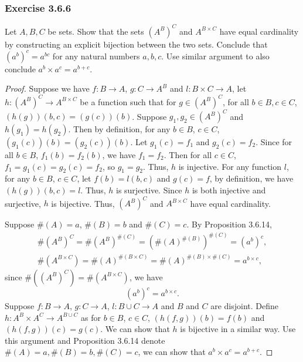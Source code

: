 \documentclass[12pt, letter]{article}
\begin{document}
\subsubsection*{Exercise 3.6.6}
Let $A,B,C$ be sets. Show that the sets $(A^B)^C$ and $A^{B\times C}$ have equal cardinality by constructing an explicit bijection between the two sets.
Conclude that $(a^b)^c=a^{bc}$ for any natural numbers $a,b,c$. Use similar argument to also conclude $a^b\times a^c=a^{b+c}$.
\begin{proof}
    Suppose we have $f:B\to A$, $g:C\to A^B$ and $l:B\times C\to A$, let $h:(A^B)^C\to A^{B\times C}$ be a function such that for $g\in (A^B)^C$, for all $b\in B, c\in C$,
    $(h(g))(b,c)=(g(c))(b)$. Suppose $g_1,g_2\in (A^B)^C$ and $h(g_1)=h(g_2)$. Then by definition, for any $b\in B$, $c\in C$, $(g_1(c))(b)=(g_2(c))(b)$. Let $g_1(c)=f_1$ and $g_2(c)=f_2$. 
    Since for all $b\in B$, $f_1(b)=f_2(b)$, we have $f_1=f_2$. Then for all $c\in C$, $f_1=g_1(c)=g_2(c)=f_2$, so $g_1=g_2$. Thus, $h$ is injective. For any function $l$, for any
    $b\in B$, $c\in C$, let $f(b)=l(b,c)$ and $g(c)=f$, by definition, we have $(h(g))(b,c)=l$. Thus, $h$ is surjective. Since $h$ is both injective and surjective, $h$ is bijective. Thus,
    $(A^B)^C$ and $A^{B\times C}$ have equal cardinality. 
    
    Suppose $\#(A)=a$, $\#(B)=b$ and $\#(C)=c$. By Proposition 3.6.14,
    \begin{equation*}
        \begin{gathered}
            \#(A^B)^C=\#(A^B)^{\#(C)}=(\#(A)^{\#(B)})^{\#(C)}=(a^b)^c,\\
            \#(A^{B\times C})=\#(A)^{\#(B\times C)}=\#(A)^{\#(B)\times \#(C)}=a^{b\times c},
        \end{gathered}
    \end{equation*}
    since $\#((A^B)^C)=\#(A^{B \times C})$, we have 
    \begin{equation*}
        (a^b)^c=a^{b\times c}.
    \end{equation*}
    Suppose $f: B\to A$, $g:C\to A$, $l:B\cup C\to A$ and $B$ and $C$ are disjoint. Define $h:A^B\times A^C\to A^{B\cup C}$ as for $b\in B$,
    $c\in C$, $(h(f,g))(b)=f(b)$ and $(h(f,g))(c)=g(c)$. We can show that $h$ is bijective in a similar way. Use this argument and Proposition 3.6.14
    denote $\#(A)=a,\#(B)=b,\#(C)=c$, we can show that $a^b\times a^c=a^{b+c}$.
\end{proof}
\end{document}

